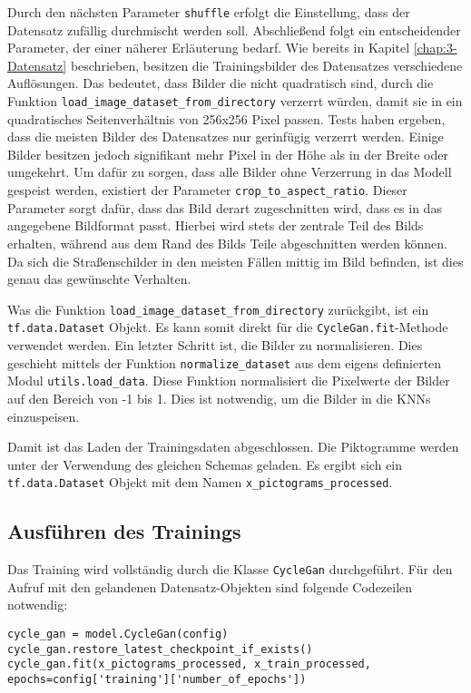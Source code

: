 Durch den nächsten Parameter \texttt{shuffle} erfolgt die Einstellung, dass der Datensatz zufällig durchmischt werden soll. Abschließend folgt ein entscheidender Parameter, der einer näherer Erläuterung bedarf. Wie bereits in Kapitel \ref{chap:3-Datensatz} beschrieben, besitzen die Trainingsbilder des Datensatzes verschiedene Auflösungen. Das bedeutet, dass Bilder die nicht quadratisch sind, durch die Funktion \texttt{load_image_dataset_from_directory} verzerrt würden, damit sie in ein quadratisches Seitenverhältnis von 256x256 Pixel passen. Tests haben ergeben, dass die meisten Bilder des Datensatzes nur gerinfügig verzerrt werden. Einige Bilder besitzen jedoch signifikant mehr Pixel in der Höhe als in der Breite oder umgekehrt. Um dafür zu sorgen, dass alle Bilder ohne Verzerrung in das Modell gespeist werden, existiert der Parameter \texttt{crop_to_aspect_ratio}. Dieser Parameter sorgt dafür, dass das Bild derart zugeschnitten wird, dass es in das angegebene Bildformat passt. Hierbei wird stets der zentrale Teil des Bilds erhalten, während aus dem Rand des Bilds Teile abgeschnitten werden können. Da sich die Straßenschilder in den meisten Fällen mittig im Bild befinden, ist dies genau das gewünschte Verhalten.

Was die Funktion \texttt{load_image_dataset_from_directory} zurückgibt, ist ein \texttt{tf.data.Dataset} Objekt. Es kann somit direkt für die \texttt{CycleGan.fit}-Methode verwendet werden. Ein letzter Schritt ist, die Bilder zu normalisieren. Dies geschieht mittels der Funktion \texttt{normalize_dataset} aus dem eigens definierten Modul \texttt{utils.load_data}. Diese Funktion normalisiert die Pixelwerte der Bilder auf den Bereich von -1 bis 1. Dies ist notwendig, um die Bilder in die \acp{KNN} einzuspeisen.

Damit ist das Laden der Trainingsdaten abgeschlossen. Die Piktogramme werden unter der Verwendung des gleichen Schemas geladen. Es ergibt sich ein \texttt{tf.data.Dataset} Objekt mit dem Namen \texttt{x_pictograms_processed}.

\subsection{Ausführen des Trainings}
Das Training wird vollständig durch die Klasse \texttt{CycleGan} durchgeführt. Für den Aufruf mit den gelandenen Datensatz-Objekten sind folgende Codezeilen notwendig:
\begin{code}
    \begin{verbatim}
cycle_gan = model.CycleGan(config)
cycle_gan.restore_latest_checkpoint_if_exists()
cycle_gan.fit(x_pictograms_processed, x_train_processed, epochs=config['training']['number_of_epochs'])
    \end{verbatim}
 \end{code}

